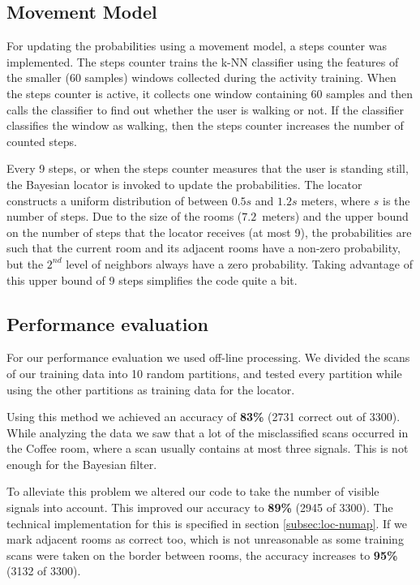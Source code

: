 \documentclass[a4paper,10pt,twoside]{IEEEtran}
\begin{document}
\subsection{Movement Model}
For updating the probabilities using a movement model, a steps counter was implemented. The steps counter trains the k-NN classifier using the features of the smaller (60 samples) windows collected during the activity training. When the steps counter is active, it collects one window containing 60 samples and then calls the classifier to find out whether the user is walking or not. If the classifier classifies the window as walking, then the steps counter increases the number of counted steps.

Every 9 steps, or when the steps counter measures that the user is standing still, the Bayesian locator is invoked to update the probabilities. The locator constructs a uniform distribution of between $0.5s$ and $1.2s$ meters, where $s$ is the number of steps. Due to the size of the rooms ($7.2$~meters) and the upper bound on the number of steps that the locator receives (at most 9), the probabilities are such that the current room and its adjacent rooms have a non-zero probability, but the $2^{nd}$ level of neighbors always have a zero probability. Taking advantage of this upper bound of 9 steps simplifies the code quite a bit.

\subsection{Performance evaluation}
\label{sec:loc-evaluation}

For our performance evaluation we used off-line processing. We divided the scans of our training data into 10 random partitions, and tested every partition while using the other partitions as training data for the locator.

Using this method we achieved an accuracy of \textbf{83\%} (2731 correct out of 3300).
While analyzing the data we saw that a lot of the misclassified scans occurred in the Coffee room,
where a scan usually contains at most three signals. This is not enough for the Bayesian filter.

To alleviate this problem we altered our code to take the number of visible signals into account.
This improved our accuracy to \textbf{89\%} (2945 of 3300).
The technical implementation for this is specified in section \ref{subsec:loc-numap}.
If we mark adjacent rooms as correct too, which is not unreasonable as some training scans were taken on the border between rooms, the accuracy increases to \textbf{95\%} (3132 of 3300).
\end{document}
